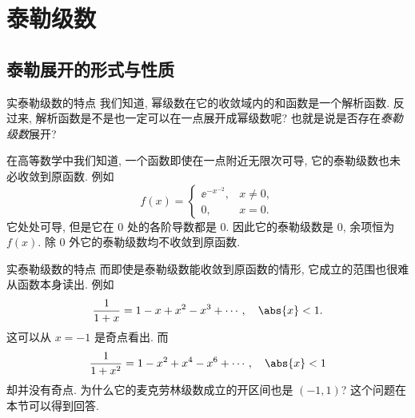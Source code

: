 \section{泰勒级数}

\subsection{泰勒展开的形式与性质}

\begin{frame}{实泰勒级数的特点}
	\onslide<+->
	我们知道, 幂级数在它的收敛域内的和函数是一个解析函数.
	\onslide<+->
	反过来, 解析函数是不是也一定可以在一点展开成幂级数呢? 也就是说是否存在\emph{泰勒级数}展开?

	\onslide<+->
	在高等数学中我们知道, 一个函数即使在一点附近无限次可导, 它的泰勒级数也未必收敛到原函数.
	\onslide<+->
	例如
	\[f(x)=\begin{cases}
	\ee^{-x^{-2}},&x\neq 0,\\
	0,&x=0.\end{cases}
	\]
	\onslide<+->
	它处处可导, 但是它在 $0$ 处的各阶导数都是 $0$.
	\onslide<+->
	因此它的泰勒级数是 $0$, 余项恒为 $f(x)$.
	\onslide<+->
	除 $0$ 外它的泰勒级数均不收敛到原函数.
\end{frame}


\begin{frame}{实泰勒级数的特点}
	\onslide<+->
	而即使是泰勒级数能收敛到原函数的情形, 它成立的范围也很难从函数本身读出.
	\onslide<+->
	例如
	\[
		\dfrac1{1+x}=1-x+x^2-x^3+\cdots,\quad\abs{x}<1.
	\]
	\onslide<+->
	这可以从 $x=-1$ 是奇点看出.
	\onslide<+->
	而
	\[
		\dfrac1{1+x^2}=1-x^2+x^4-x^6+\cdots,\quad\abs{x}<1
	\]
	却并没有奇点.
	\onslide<+->
	为什么它的麦克劳林级数成立的开区间也是 $(-1,1)$?
	\onslide<+->
	这个问题在本节可以得到回答.
\end{frame}


